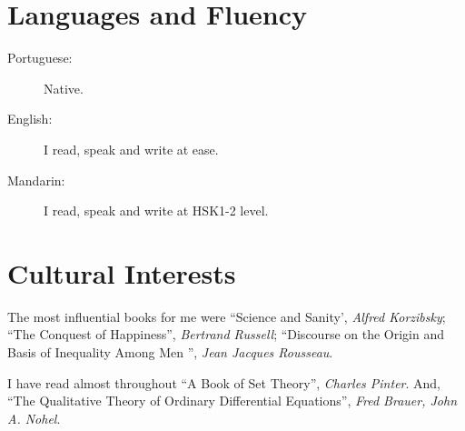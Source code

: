 \documentclass[letterpaper]{twentysecondcvenglish} %
\makeatletter
\def\py@yunpriv#1{%
  \if a#1 10\else
  \if o#1 9\else
  \if e#1 8\else
  \if i#1 7\else
  \if u#1 6\else
  \if v#1 5\else
  \if A#1 4\else
  \if O#1 3\else
  \if E#1 2\fi\fi\fi\fi\fi\fi\fi\fi\fi0
}
\def\py@init{%
  \edef\py@befirst{}%
  \edef\py@char{}\edef\py@tuneletter{}%
  \def\py@last{}%
  \def\py@tune{5}%
}
\def\pinyin#1{%
  \edef\py@postscan{#1}%
  \py@init
  \loop
  \edef\py@char{\expandafter\@car\py@postscan\@nil}%
  \edef\py@postscan{\expandafter\@cdr\py@postscan\@nil}%
  \ifnum 0 < 0\py@char
    \edef\py@tune{\py@char}%
    \py@first \py@tuneat\py@tuneletter\py@tune \py@last\kern -4sp\kern 4sp{}\py@init
  \else
    \ifnum\py@yunpriv\py@char > \py@yunpriv\py@tuneletter
      \edef\py@tuneletter{\py@char}\edef\py@first{\py@befirst}\def\py@last{}%
    \else
      \edef\py@last{\py@last\if v\py@char\"u\else\py@char\fi}%
    \fi
    \edef\py@befirst{\py@befirst\if v\py@char\"u\else\py@char\fi}%
  \fi
  \ifx\py@postscan\@empty\else
  \repeat
}
\let\py@macron \=
\let\py@acute \'
\let\py@hacek \v
\let\py@grave \`
\def\py@tuneat#1#2{%
  \if v#1%
    \py@tune@v #2%
  \else
  \if i#1%
    \py@tune@i #2%
  \else
    \ifcase#2%
      \or\py@macron #1\or\py@acute #1\or\py@hacek #1\or\py@grave #1\else #1%
    \fi
  \fi\fi
}
\def\py@tune@v#1{{%
    \dimen@ii 1ex%
    \fontdimen5\font 1.1ex%
    \rlap{\"u}%
    \fontdimen5\font .6ex%
    \ifcase#1%
      \or\py@macron u\or\py@acute u\or\py@hacek u\or\py@grave u\else u%
    \fi
    \fontdimen5\font\dimen@ii
  }}
\def\py@tune@i#1{%
  \ifcase#1
    \or\py@macron \i\or\py@acute \i\or\py@hacek \i\or\py@grave \i\else i%
  \fi
}
\makeatother
\begin{document}
\vspace{0.2cm}
\section{Languages and Fluency}

\begin{description}
\item[Portuguese:] Native.
\item[English:] I read, speak and write at ease.
\item[Mandarin:] I read, speak and write at HSK1-2 level.

\end{description}

\vspace{0.2cm}

\section{Cultural Interests}

\vspace{0.05mm}

The most influential books for me were ``Science and Sanity',
\textit{Alfred Korzibsky}; ``The Conquest of Happiness'', \textit{Bertrand Russell}; ``Discourse on the Origin and Basis of Inequality Among Men '',
\textit{Jean Jacques Rousseau}.

I have read almost throughout ``A Book of Set Theory'', \textit{Charles
  Pinter}. And, ``The Qualitative Theory of Ordinary Differential
Equations'', \textit{Fred Brauer, John A. Nohel}.
\end{document}
